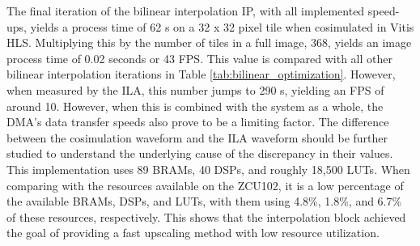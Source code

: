 \documentclass{article}
\newcounter{subsubsubsection}[subsubsection]
\begin{document}
            \noindent The final iteration of the bilinear interpolation IP, with all implemented speed-ups, yields a process time of 62 \textmu s on a 32 x 32 pixel tile when cosimulated in Vitis HLS. Multiplying this by the number of tiles in a full image, 368, yields an image process time of 0.02 seconds or 43 FPS. This value is compared with all other bilinear interpolation iterations in Table \ref{tab:bilinear_optimization}. However, when measured by the ILA, this number jumps to 290 \textmu s, yielding an FPS of around 10. However, when this is combined with the system as a whole, the DMA’s data transfer speeds also prove to be a limiting factor. The difference between the cosimulation waveform and the ILA waveform should be further studied to understand the underlying cause of the discrepancy in their values. This implementation uses 89 BRAMs, 40 DSPs, and roughly 18,500 LUTs. When comparing with the resources available on the ZCU102, it is a low percentage of the available BRAMs, DSPs, and LUTs, with them using 4.8\%, 1.8\%, and 6.7\% of these resources, respectively. This shows that the interpolation block achieved the goal of providing a fast upscaling method with low resource utilization.

            \begin{table}[h]
            \centering
            \caption{Resource utilization comparison between each iteration of the bilinear interpolation block on the ZCU102. The process speed measurement is taken from the co-simulation waveforms in Vitis HLS.}
            \label{tab:bilinear_optimization}
            \end{table}
\end{document}
